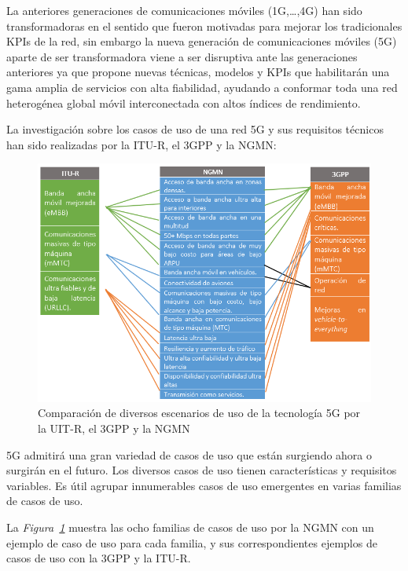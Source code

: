 La anteriores generaciones de comunicaciones móviles (1G,{\dots},4G) han sido transformadoras en el sentido que fueron motivadas para mejorar los tradicionales KPIs de la red, sin embargo la nueva generación de comunicaciones móviles (5G) aparte de ser transformadora viene a ser disruptiva ante las generaciones anteriores ya que propone nuevas técnicas, modelos y KPIs que habilitarán una gama amplia de servicios con alta fiabilidad, ayudando a conformar toda una red heterogénea global móvil interconectada con altos índices de rendimiento.\newline

La investigación sobre los casos de uso de una red 5G y sus requisitos técnicos han sido realizadas por la ITU-R, el 3GPP y la NGMN:

\begin{figure}[th]
\centering
\includegraphics[scale=1]{Figures/Comparación de diversos escenarios de uso de la tecnología 5G}
\decoRule
\caption[Comparación de diversos escenarios de uso de la tecnología 5G por la UIT-R, el 3GPP y la NGMN]{Comparación de diversos escenarios de uso de la tecnología 5G por la UIT-R, el 3GPP y la NGMN}
\label{fig:5g}
\end{figure}

5G admitirá una gran variedad de casos de uso que están surgiendo ahora o surgirán en el futuro. Los diversos casos de uso tienen características y requisitos variables. Es útil agrupar innumerables casos de uso emergentes en varias familias de casos de uso. \newline

La \textit{Figura~\ref{fig:5g}} muestra las ocho familias de casos de uso por la NGMN con un ejemplo de caso de uso para cada familia, y sus correspondientes ejemplos de casos de uso con la 3GPP y la ITU-R.\newline

